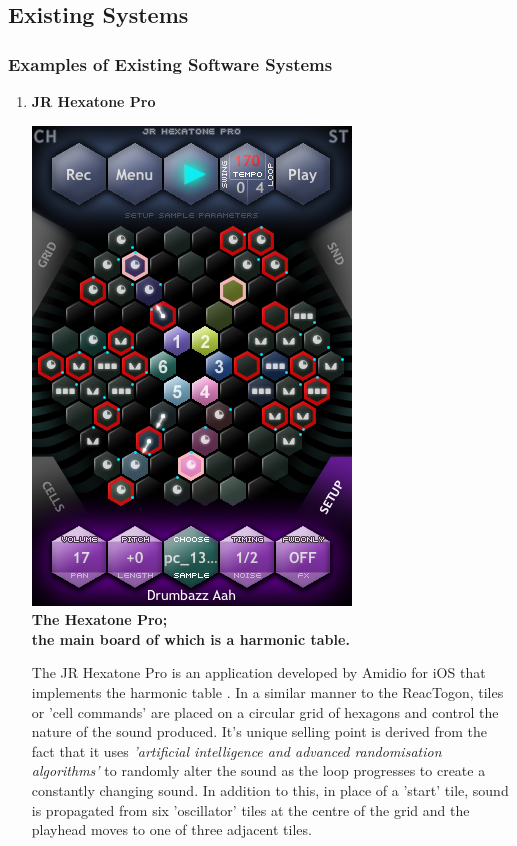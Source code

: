 \documentclass[10pt,a4paper]{article}
\begin{document}
\subsection{Existing Systems}
\subsubsection{Examples of Existing Software Systems}
\begin{enumerate}
\item \textbf{JR Hexatone Pro}
\begin{center}
\includegraphics[scale=0.35]{2.jpg}\\
\textbf{The Hexatone Pro;\\ the main board of which is a harmonic table.}
\end{center}
The JR Hexatone Pro is an application developed by Amidio for iOS that implements the harmonic table \cite{jrhexitunes}.  In a similar manner to the ReacTogon, tiles or 'cell commands' are placed on a circular grid of hexagons and control the nature of the sound produced. It’s unique selling point is derived from the fact that it uses \textit{'artificial intelligence and advanced randomisation algorithms'} \cite{randomalg} to randomly alter the sound as the loop progresses to create a constantly changing sound. In addition to this, in place of a 'start' tile, sound is propagated from six 'oscillator' tiles at the centre of the grid and the playhead moves to one of three adjacent tiles. \cite{amidiomanual}


\end{enumerate}
\end{document}
